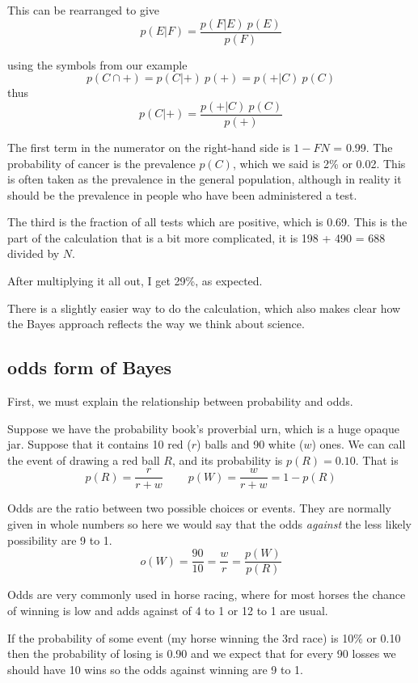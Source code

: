 \documentclass[11pt, oneside]{article}
\begin{document}
This can be rearranged to give
\[ p(E|F) = \frac{p(F|E) \ p(E)}{p(F)} \]

using the symbols from our example
\[ p(C \cap +) = p(C|+) \ p(+) = p(+|C) \ p(C) \]
thus
\[ p(C|+) = \frac{p(+|C) \ p(C)}{p(+)} \]

The first term in the numerator on the right-hand side is $1- FN$ = 0.99.  The probability of cancer is the prevalence $p(C)$, which we said is 2\% or 0.02.  This is often taken as the prevalence in the general population, although in reality it should be the prevalence in people who have been administered a test.

The third is the fraction of all tests which are positive, which is 0.69.  This is the part of the calculation that is a bit more complicated, it is 198 + 490 = 688 divided by $N$.

After multiplying it all out, I get 29\%, as expected.

There is a slightly easier way to do the calculation, which also makes clear how the Bayes approach reflects the way we think about science.

\subsection*{odds form of Bayes}

First, we must explain the relationship between probability and odds.

Suppose we have the probability book's proverbial urn, which is a huge opaque jar.  Suppose that it contains 10 red ($r$) balls and 90 white ($w$) ones.  We can call the event of drawing a red ball $R$, and its probability is $p(R) = 0.10$.  That is
\[ p(R) = \frac{r}{r + w} \ \ \ \ \ \ \ \  \ \  p(W) = \frac{w}{r + w}  = 1 - p(R) \]

Odds are the ratio between two possible choices or events.  They are normally given in whole numbers so here we would say that the odds \emph{against} the less likely possibility are 9 to 1.
\[ o(W) = \frac{90}{10} =  \frac{w}{r} = \frac{p(W)}{p(R)}  \]

Odds are very commonly used in horse racing, where for most horses the chance of winning is low and adds against of 4 to 1 or 12 to 1 are usual.

If the probability of some event (my horse winning the 3rd race)  is 10\% or 0.10 then the probability of losing is 0.90 and we expect that for every 90 losses we should have 10 wins so the odds against winning are 9 to 1.
\end{document}
